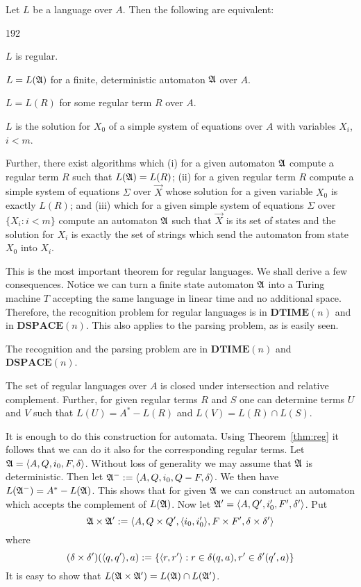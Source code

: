 \begin{thm}[Kleene]
\label{thm:reg}
Let $L$ be a language over $A$. Then the following are equivalent:
\begin{dingautolist}{192}
\item
$L$ is regular.
\item
$L = L(\mathfrak{A})$ for a finite, deterministic automaton
$\mathfrak{A}$ over $A$.
\item
$L = L(R)$ for some regular term $R$ over $A$.
\item
$L$ is the solution for $X_0$ of a simple system of equations
over $A$ with variables $X_i$, $i < m$.
\end{dingautolist}
Further, there exist algorithms which (i) for a given automaton
$\mathfrak{A}$ compute a regular term $R$ such that $L(\mathfrak{A}) = L(R)$; (ii)
for a given regular term $R$ compute a simple system of equations
$\Sigma$ over $\vec{X}$ whose solution for a given variable $X_0$
is exactly $L(R)$; and (iii) which for a given simple system
of equations $\Sigma$ over $\{X_i : i < m\}$ compute an automaton 
$\mathfrak{A}$ such that $\vec{X}$ is its set of states and the solution for
$X_i$ is exactly the set of strings which send the automaton from
state $X_0$ into $X_i$. \proofend
\end{thm}
This is the most important theorem for regular languages.
We shall derive a few consequences. Notice we can turn a 
finite state automaton $\mathfrak{A}$ into a Turing machine $T$ 
accepting the same language in linear time and no additional 
space.  Therefore, the recognition problem for regular languages 
is in $\textbf{DTIME}(n)$ and in $\textbf{DSPACE}(n)$. This 
also applies to the parsing problem, as is easily seen.
\begin{cor}
The recognition and the parsing problem are in
$\textbf{DTIME}(n)$ and $\textbf{DSPACE}(n)$.
\end{cor}
\begin{cor}
\label{cor:con} The set of regular languages over $A$ is closed
under intersection and relative complement. Further, for given
regular terms $R$ and $S$ one can determine terms $U$ and $V$ such
that $L(U) = A^{\ast} - L(R)$ and $L(V) = L(R) \cap L(S)$.
\end{cor}
\proofbeg
It is enough to do this construction for automata.  Using
Theorem~\ref{thm:reg} it follows that we can do it also for
the corresponding regular terms. Let $\mathfrak{A} = \langle A, Q, i_0, F,
\delta\rangle$. Without loss of generality we may assume that
$\mathfrak{A}$ is deterministic. Then let $\mathfrak{A}^- := \langle A, Q, i_0, Q - F,
\delta\rangle$. We then have $L(\mathfrak{A}^-) = A^{\ast} - L(\mathfrak{A})$.
This shows that for given $\mathfrak{A}$ we can construct an automaton
which accepts the complement of $L(\mathfrak{A})$.
Now let $\mathfrak{A}' = \langle A, Q', i_0', F', \delta'\rangle$.
Put 
\begin{equation}
\mathfrak{A}  \times \mathfrak{A}' := \langle A, Q\times Q', \langle i_0, i_0'\rangle,
F \times F', \delta \times \delta'\rangle
\end{equation}
where
\begin{equation}
(\delta \times \delta')(\langle q,q'\rangle, a) := \{\langle
r,r'\rangle : r \in \delta(q,a), r' \in \delta'(q',a)\} 
\end{equation}
It is easy to show that $L(\mathfrak{A} \times \mathfrak{A}') =
L(\mathfrak{A}) \cap L(\mathfrak{A}')$.
\proofend

